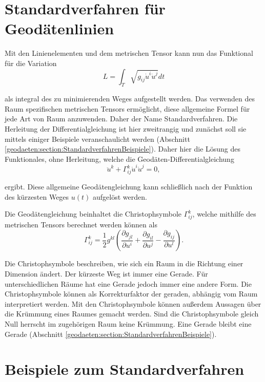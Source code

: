 %
%
%
%
\section{Standardverfahren für Geodätenlinien
\label{geodaeten:section:Standardverfahren}}

Mit den Linienelementen und dem metrischen Tensor kann nun das Funktional für die Variation
\begin{equation}
	L = \int_T \sqrt{g_{ij} \dot{u}^i \dot{u}^j} dt
\end{equation}

als integral des zu minimierenden Weges aufgestellt werden.
Das verwenden des Raum spezifischen metrischen Tensors ermöglicht, diese allgemeine Formel für jede Art von Raum anzuwenden.
Daher der Name Standardverfahren.
Die Herleitung der Differentialgleichung ist hier zweitrangig und zunächst soll sie mittels einiger Beispiele veranschaulicht werden (Abschnitt \ref{geodaeten:section:StandardverfahrenBeispiele}).
Daher hier die Lösung des Funktionales, ohne Herleitung, welche die Geodäten-Differentialgleichung
\begin{equation}
	\ddot{u}^k + \Gamma_{ij}^k \dot{u}^i \dot{u}^j = 0 ,
	\label{geodaeten:equation:Standardverfahren:Geodaetengleichung}
\end{equation}

ergibt.
Diese allgemeine Geodätengleichung kann schließlich nach der Funktion des kürzesten Weges $u(t)$ aufgelöst werden.

Die Geodätengleichung beinhaltet die Christophsymbole $\Gamma_{ij}^k$, welche mithilfe des metrischen Tensors berechnet werden können als
\begin{equation}
	\Gamma_{ij}^k = \frac{1}{2} g^{kl} \left( \frac{\partial g_{jl}}{\partial u^i} + \frac{\partial g_{il}}{\partial u^j} - \frac{\partial g_{ij}}{\partial u^l} \right) .
	\label{geodaeten:equation:Standardverfahren:Christophsymbole}
\end{equation}

Die Christophsymbole beschreiben, wie sich ein Raum in die Richtung einer Dimension ändert.
Der kürzeste Weg ist immer eine Gerade.
Für unterschiedlichen Räume hat eine Gerade jedoch immer eine andere Form.
Die Christophsymbole können als Korrekturfaktor der geraden, abhängig vom Raum interpretiert werden.
Mit den Christophsymbole können außerdem Aussagen über die Krümmung eines Raumes gemacht werden.
Sind die Christophsymbole gleich Null herrscht im zugehörigen Raum keine Krümmung. 
Eine Gerade bleibt eine Gerade (Abschnitt \ref{geodaeten:section:StandardverfahrenBeispiele}).

\section{Beispiele zum Standardverfahren 
\label{geodaeten:section:StandardverfahrenBeispiele}}




